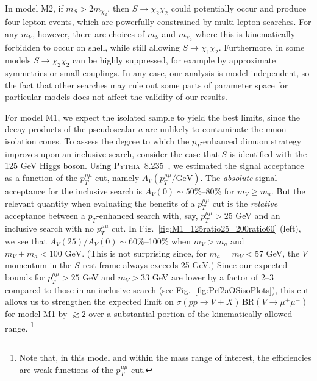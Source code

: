 \documentclass[aps,prd,twocolumn,superscriptaddress,preprintnumbers,nofootinbib,longbibliography,floatfix]{revtex4-1}
\newcommand{\nameofsearch}{$p_T$-enhanced }
\newcommand{\ptmm}{p_T^{\mu\mu}}
\newcommand{\GeV}{\text{~GeV}}
\newcommand{\BR}{\text{BR}}
\DeclareRobustCommand{\Fig}[1]{Fig.~\ref{#1}}
\begin{document}
In model M2, if $m_S>2 m_{\chi_2}$, then $S\to \chi_2\chi_2$ could potentially occur and produce four-lepton events, which are powerfully constrained by multi-lepton searches.  
%
For any $m_V$, however, there are choices of $m_S$ and $m_{\chi_2}$ where this is kinematically forbidden to occur on shell, while still allowing $S\to \chi_1\chi_2$.
%
Furthermore, in some models $S\to \chi_2\chi_2$ can be highly suppressed, for example by approximate symmetries or small couplings.  
%
In any case, our analysis is model independent, so the fact that other searches may rule out some parts of parameter space for particular models does not affect the validity of our results.



For model M1, we expect the isolated sample to yield the best limits, since the decay products of the pseudoscalar  $a$ are unlikely to contaminate the muon isolation cones.
%
To assess the degree to which the \nameofsearch dimuon strategy improves upon an inclusive search, consider the case that $S$ is identified with the 125 GeV Higgs boson. 
%
Using \textsc{Pythia}~8.235~\cite{Sjostrand:2014zea}, we estimated the signal acceptance as a function of the $\ptmm$ cut, namely $A_V(\ptmm/\text{GeV})$.
%
The {\it absolute} signal acceptance for the inclusive search is $A_V(0)\sim 50\%$--80\% for $m_V\geq m_a$.
%
But the relevant quantity when evaluating the benefits of a $\ptmm$ cut is the {\it relative} acceptance between a \nameofsearch search with, say, $\ptmm>25$ GeV and an inclusive search with no $\ptmm$ cut.
%
In \Fig{fig:M1_125ratio25_200ratio60} (left), we see that $A_V(25)/A_V(0) \sim 60\%$--100\% when $m_V>m_a$ and $m_V+m_a<100 \GeV$.
%
(This is not surprising since, for $m_a=m_V<57$ GeV, the $V$ momentum in the $S$ rest frame always exceeds 25 GeV.)
%
Since our expected bounds for $p_T^{\mu\mu}>25$ GeV and $m_V>33$ GeV are lower by a factor of 2--3 compared to those in an inclusive search (see \Fig{fig:Prf2aOSisoPlots}), this cut allows us to strengthen the expected limit on $\sigma(pp\to V+X) \, \BR (V\to\mu^+\mu^-)$ for model M1 by $\gtrsim 2$ over a substantial portion of the kinematically allowed range.%
%
\footnote{Note that, in this model and within the mass range of interest, the efficiencies are weak functions of the $\ptmm$ cut.}
\end{document}
